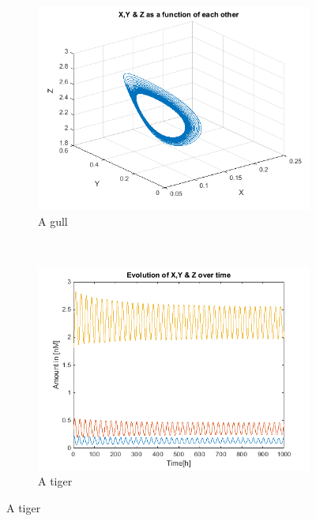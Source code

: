 \documentclass[10pt,a4paper,oneside,twocolumn]{article}
\numberwithin{equation}{section} %
\begin{document}
    \begin{figure}[!h]
	\begin{subfigure}[b]{0.5\textwidth}
	    \includegraphics[width=\textwidth]{A11.png}
	    \caption{A gull}
	    \label{fig:gull}
	\end{subfigure}
	~ %
	\begin{subfigure}[b]{0.5\textwidth}
	    \includegraphics[width=\textwidth]{A12.png}
	    \caption{A tiger}
	    \label{fig:tiger}
	\end{subfigure}
    \end{figure}
\end{document}
